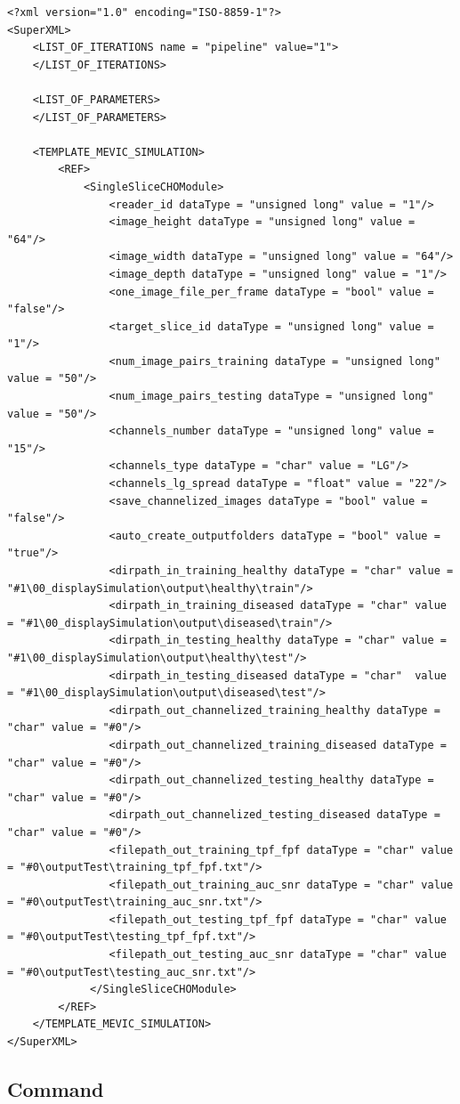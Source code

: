 \lstset{language=XML}
\begin{lstlisting}
<?xml version="1.0" encoding="ISO-8859-1"?>
<SuperXML>
	<LIST_OF_ITERATIONS name = "pipeline" value="1">	
	</LIST_OF_ITERATIONS>
	
	<LIST_OF_PARAMETERS>
	</LIST_OF_PARAMETERS>

	<TEMPLATE_MEVIC_SIMULATION>
		<REF>
			<SingleSliceCHOModule>
				<reader_id dataType = "unsigned long" value = "1"/>
				<image_height dataType = "unsigned long" value = "64"/>
				<image_width dataType = "unsigned long" value = "64"/>
				<image_depth dataType = "unsigned long" value = "1"/>
				<one_image_file_per_frame dataType = "bool" value = "false"/>
				<target_slice_id dataType = "unsigned long" value = "1"/>
				<num_image_pairs_training dataType = "unsigned long" value = "50"/>
				<num_image_pairs_testing dataType = "unsigned long" value = "50"/>
				<channels_number dataType = "unsigned long" value = "15"/>	
				<channels_type dataType = "char" value = "LG"/>
				<channels_lg_spread dataType = "float" value = "22"/>
				<save_channelized_images dataType = "bool" value = "false"/>
				<auto_create_outputfolders dataType = "bool" value = "true"/>
				<dirpath_in_training_healthy dataType = "char" value = "#1\00_displaySimulation\output\healthy\train"/>
				<dirpath_in_training_diseased dataType = "char" value = "#1\00_displaySimulation\output\diseased\train"/>
				<dirpath_in_testing_healthy dataType = "char" value = "#1\00_displaySimulation\output\healthy\test"/>
				<dirpath_in_testing_diseased dataType = "char"  value = "#1\00_displaySimulation\output\diseased\test"/>
				<dirpath_out_channelized_training_healthy dataType = "char" value = "#0"/>
				<dirpath_out_channelized_training_diseased dataType = "char" value = "#0"/>
				<dirpath_out_channelized_testing_healthy dataType = "char" value = "#0"/>
				<dirpath_out_channelized_testing_diseased dataType = "char" value = "#0"/>
				<filepath_out_training_tpf_fpf dataType = "char" value = "#0\outputTest\training_tpf_fpf.txt"/>
				<filepath_out_training_auc_snr dataType = "char" value = "#0\outputTest\training_auc_snr.txt"/>
				<filepath_out_testing_tpf_fpf dataType = "char" value = "#0\outputTest\testing_tpf_fpf.txt"/>
				<filepath_out_testing_auc_snr dataType = "char" value = "#0\outputTest\testing_auc_snr.txt"/>
			 </SingleSliceCHOModule>
		</REF>	
	</TEMPLATE_MEVIC_SIMULATION>
</SuperXML>
\end{lstlisting}

\subsection{Command}

